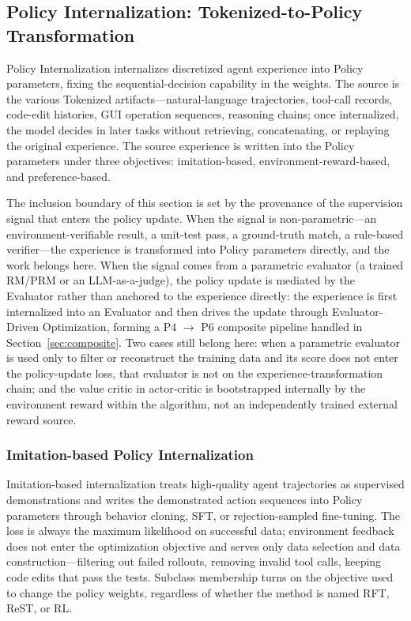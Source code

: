 \subsection{Policy Internalization: Tokenized-to-Policy Transformation}
\label{sec:policy-internalization}

Policy Internalization internalizes discretized agent experience into Policy parameters, fixing the sequential-decision capability in the weights. The source is the various Tokenized artifacts---natural-language trajectories, tool-call records, code-edit histories, GUI operation sequences, reasoning chains; once internalized, the model decides in later tasks without retrieving, concatenating, or replaying the original experience. The source experience is written into the Policy parameters under three objectives: imitation-based, environment-reward-based, and preference-based.

The inclusion boundary of this section is set by the provenance of the supervision signal that enters the policy update. When the signal is non-parametric---an environment-verifiable result, a unit-test pass, a ground-truth match, a rule-based verifier---the experience is transformed into Policy parameters directly, and the work belongs here. When the signal comes from a parametric evaluator (a trained RM/PRM or an LLM-as-a-judge), the policy update is mediated by the Evaluator rather than anchored to the experience directly: the experience is first internalized into an Evaluator and then drives the update through Evaluator-Driven Optimization, forming a P4 $\rightarrow$ P6 composite pipeline handled in Section~\ref{sec:composite}. Two cases still belong here: when a parametric evaluator is used only to filter or reconstruct the training data and its score does not enter the policy-update loss, that evaluator is not on the experience-transformation chain; and the value critic in actor-critic is bootstrapped internally by the environment reward within the algorithm, not an independently trained external reward source.

\subsubsection{Imitation-based Policy Internalization}

Imitation-based internalization treats high-quality agent trajectories as supervised demonstrations and writes the demonstrated action sequences into Policy parameters through behavior cloning, SFT, or rejection-sampled fine-tuning. The loss is always the maximum likelihood on successful data; environment feedback does not enter the optimization objective and serves only data selection and data construction---filtering out failed rollouts, removing invalid tool calls, keeping code edits that pass the tests. Subclass membership turns on the objective used to change the policy weights, regardless of whether the method is named RFT, ReST, or RL.


